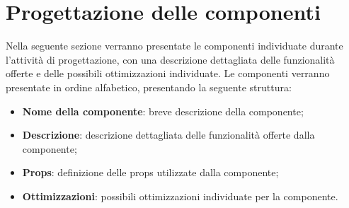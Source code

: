 \section{Progettazione delle componenti}
Nella seguente sezione verranno presentate le componenti individuate durante l'attività di progettazione, con una descrizione dettagliata delle
funzionalità offerte e delle possibili ottimizzazioni individuate. \newline
Le componenti verranno presentate in ordine alfabetico, presentando la seguente struttura:
\begin{itemize}
      \item \textbf{Nome della componente}: breve descrizione della componente;
      \item \textbf{Descrizione}: descrizione dettagliata delle funzionalità offerte dalla componente;
      \item \textbf{Props}: definizione delle props utilizzate dalla componente;
      \item \textbf{Ottimizzazioni}: possibili ottimizzazioni individuate per la componente.
\end{itemize}

